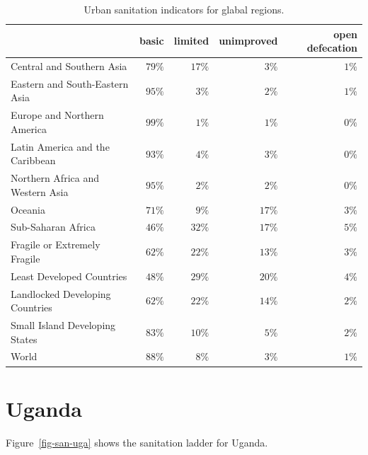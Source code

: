 \documentclass[
  letterpaper,
  DIV=11,
  numbers=noendperiod]{scrartcl}
\begin{document}
\hypertarget{tbl-reg-sanitation}{}
\begin{longtable}{l|rrrr}
\caption{\label{tbl-reg-sanitation}Urban sanitation indicators for glabal regions. }\tabularnewline

\toprule
\multicolumn{1}{l}{} & \textbf{basic} & \textbf{limited} & \textbf{unimproved} & \textbf{open defecation} \\ 
\midrule
Central and Southern Asia & $79\%$ & $17\%$ & $3\%$ & $1\%$ \\ 
Eastern and South-Eastern Asia & $95\%$ & $3\%$ & $2\%$ & $1\%$ \\ 
Europe and Northern America & $99\%$ & $1\%$ & $1\%$ & $0\%$ \\ 
Latin America and the Caribbean & $93\%$ & $4\%$ & $3\%$ & $0\%$ \\ 
Northern Africa and Western Asia & $95\%$ & $2\%$ & $2\%$ & $0\%$ \\ 
Oceania & $71\%$ & $9\%$ & $17\%$ & $3\%$ \\ 
Sub-Saharan Africa & $46\%$ & $32\%$ & $17\%$ & $5\%$ \\ 
Fragile or Extremely Fragile & $62\%$ & $22\%$ & $13\%$ & $3\%$ \\ 
Least Developed Countries & $48\%$ & $29\%$ & $20\%$ & $4\%$ \\ 
Landlocked Developing Countries & $62\%$ & $22\%$ & $14\%$ & $2\%$ \\ 
Small Island Developing States & $83\%$ & $10\%$ & $5\%$ & $2\%$ \\ 
World & $88\%$ & $8\%$ & $3\%$ & $1\%$ \\ 
\bottomrule
\end{longtable}

\hypertarget{uganda}{%
\section{Uganda}\label{uganda}}

Figure~\ref{fig-san-uga} shows the sanitation ladder for Uganda.
\end{document}
